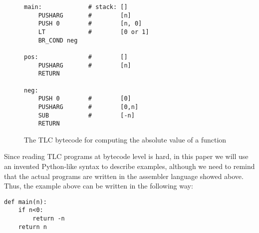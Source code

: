 \begin{figure}[h]
\begin{center}
\begin{lstlisting}
main:             # stack: []
    PUSHARG       #        [n]
    PUSH 0        #        [n, 0]
    LT            #        [0 or 1]
    BR_COND neg

pos:              #        []
    PUSHARG       #        [n]
    RETURN

neg:
    PUSH 0        #        [0]
    PUSHARG       #        [0,n]
    SUB           #        [-n]
    RETURN
\end{lstlisting}
\caption{The TLC bytecode for computing the absolute value of a function}
\label{fig:tlc-abs}
\end{center}
\end{figure}


Since reading TLC programs at bytecode level is hard, in this paper we will
use an invented Python-like syntax to describe examples, although we need to
remind that the actual programs are written in the assembler language showed
above. Thus, the example above can be written in the following way:

\begin{lstlisting}
def main(n):
    if n<0:
        return -n
    return n
\end{lstlisting}
